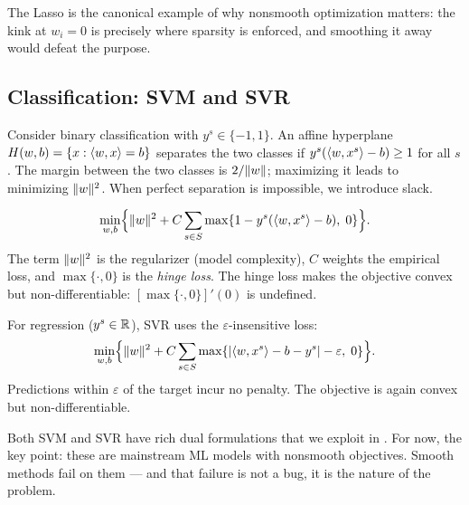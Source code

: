 The Lasso is the canonical example of why nonsmooth optimization matters: the kink at $w_i = 0$ is precisely where sparsity is enforced, and smoothing it away would defeat the purpose.


\subsection{Classification: SVM and SVR}\label{ssec:svm-svr}

Consider binary classification with $y^s \in \{-1, 1\}$.
An affine hyperplane $H(w, b) = \{x : \langle w, x\rangle = b\}$ separates the two classes if $y^s(\langle w, x^s\rangle - b) \geq 1$ for all $s$.
The margin between the two classes is $2/\lVert w\rVert$; maximizing it leads to minimizing $\lVert w\rVert^2$.
When perfect separation is impossible, we introduce slack.

\begin{defn}\label{def:svm}
	\begin{equation}\label{eq:svm}
		\min_{w, b}\Bigl\{\lVert w\rVert^2 + C \sum_{s \in S} \max\{1 - y^s(\langle w, x^s\rangle - b),\; 0\}\Bigr\}.
	\end{equation}
	The term $\lVert w\rVert^2$ is the regularizer (model complexity), $C$ weights the empirical loss, and $\max\{\cdot, 0\}$ is the \textit{hinge loss}.
	The hinge loss makes the objective convex but non-differentiable: $[\max\{\cdot, 0\}]'(0)$ is undefined.
\end{defn}

\begin{defn}\label{def:svr}
	For regression ($y^s \in \mathbb{R}$), SVR uses the $\varepsilon$-insensitive loss:
	\begin{equation}\label{eq:svr}
		\min_{w, b}\Bigl\{\lVert w\rVert^2 + C \sum_{s \in S} \max\{|\langle w, x^s\rangle - b - y^s| - \varepsilon,\; 0\}\Bigr\}.
	\end{equation}
	Predictions within $\varepsilon$ of the target incur no penalty.
	The objective is again convex but non-differentiable.
\end{defn}

Both SVM and SVR have rich dual formulations that we exploit in .
For now, the key point: these are mainstream ML models with nonsmooth objectives.
Smooth methods fail on them --- and that failure is not a bug, it is the nature of the problem.


